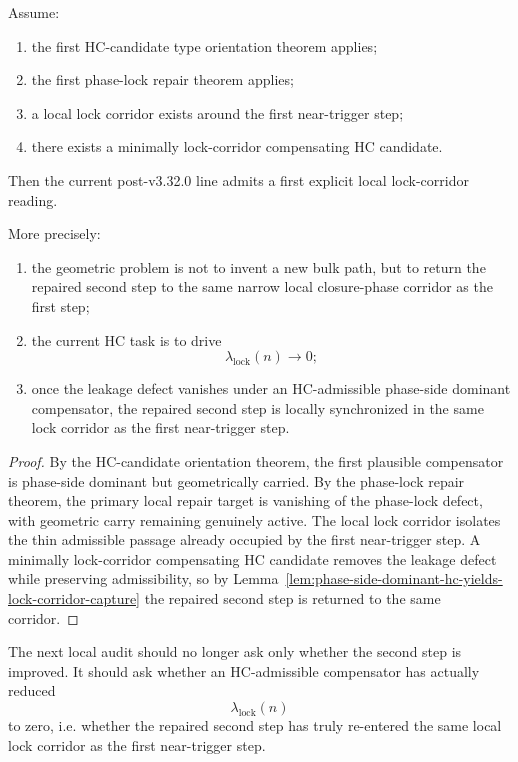 \begin{theorem}
\label{thm:first-explicit-lock-corridor-theorem}
Assume:
\begin{enumerate}[leftmargin=2em,label=(\alph*)]
  \item the first HC-candidate type orientation theorem applies;
  \item the first phase-lock repair theorem applies;
  \item a local lock corridor exists around the first near-trigger step;
  \item there exists a minimally lock-corridor compensating HC candidate.
\end{enumerate}
Then the current post-v3.32.0 line admits a first explicit local lock-corridor reading.

More precisely:
\begin{enumerate}[leftmargin=2em,label=(\roman*)]
  \item the geometric problem is not to invent a new bulk path, but to return the repaired second step to the same narrow local closure-phase corridor as the first step;
  \item the current HC task is to drive
  \[
    \lambda_{\mathrm{lock}}(n)\to 0;
  \]
  \item once the leakage defect vanishes under an HC-admissible phase-side dominant compensator, the repaired second step is locally synchronized in the same lock corridor as the first near-trigger step.
\end{enumerate}
\end{theorem}

\begin{proof}
By the HC-candidate orientation theorem, the first plausible compensator is phase-side dominant but geometrically carried. By the phase-lock repair theorem, the primary local repair target is vanishing of the phase-lock defect, with geometric carry remaining genuinely active. The local lock corridor isolates the thin admissible passage already occupied by the first near-trigger step. A minimally lock-corridor compensating HC candidate removes the leakage defect while preserving admissibility, so by Lemma~\ref{lem:phase-side-dominant-hc-yields-lock-corridor-capture} the repaired second step is returned to the same corridor.
\end{proof}

\begin{corollary}
\label{cor:current-lock-corridor-working-rule}
The next local audit should no longer ask only whether the second step is improved. It should ask whether an HC-admissible compensator has actually reduced
\[
  \lambda_{\mathrm{lock}}(n)
\]
to zero, i.e. whether the repaired second step has truly re-entered the same local lock corridor as the first near-trigger step.
\end{corollary}

